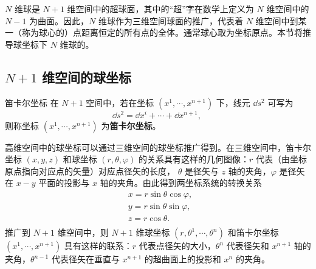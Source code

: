 
$N$ 维球是 $N+1$ 维空间中的超球面，其中的“超”字在数学上定义为 $N$ 维空间中的 $N-1$ 为曲面。因此，$N$ 维球作为三维空间球面的推广，代表着 $N$ 维空间中到某一（称为球心的）点距离恒定的所有点的全体。通常球心取为坐标原点。本节将推导球坐标下 $N$ 维球的。

\subsection{$N+1$ 维空间的球坐标}
\begin{definition}{笛卡尔坐标}
在 $N+1$ 空间中，若在坐标 $(x^1,\cdots,x^{n+1})$ 下，线元 $\dd s^2$ 可写为
\begin{equation}
\dd s^2=\dd x^i+\cdots+\dd x^{n+1},~
\end{equation}
 则称坐标 $(x^1,\cdots,x^{n+1})$ 为\textbf{笛卡尔坐标}。
\end{definition}

高维空间中的球坐标可以通过三维空间的球坐标推广得到。在三维空间中，笛卡尔坐标 $(x,y,z)$ 和球坐标 $(r,\theta,\varphi)$ 的关系具有这样的几何图像：$r$ 代表（由坐标原点指向对应点的矢量）对应点径矢的长度， $\theta$ 是径矢与 $z$ 轴的夹角，$\varphi$ 是径矢在 $x-y$ 平面的投影与 $x$ 轴的夹角。由此得到两坐标系统的转换关系
\begin{equation}
\begin{aligned}
&x=r\sin\theta\cos\varphi,\\
&y=r\sin\theta\sin\varphi,\\
&z=r\cos\theta.\\
\end{aligned}~
\end{equation}
推广到 $N+1$ 维空间中，则 $N+1$ 维球坐标 $(r,\theta^1,\cdots,\theta^{n})$ 和笛卡尔坐标 $(x^1,\cdots,x^{n+1})$ 具有这样的联系：$r$ 代表点径矢的大小，$\theta^{n}$ 代表径矢和 $x^{n+1}$ 轴的夹角，$\theta^{n-1}$ 代表径矢在垂直与 $x^{n+1}$ 的超曲面上的投影和 $x^{n}$ 的夹角。  


















